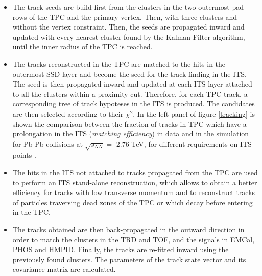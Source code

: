 \documentclass[b5paper,10pt,twoside,oldstyle,classica]{toptesi}
\begin{document}
\begin{itemize}
 \item The track seeds are build first from the clusters in the two outermost pad rows of the TPC and the primary vertex. Then, with three clusters and without the vertex constraint. Then, the seeds are propagated inward and updated with every nearest cluster found by the Kalman Filter algorithm, until the inner radius of the TPC is reached.
 \item The tracks reconstructed in the TPC are matched to the hits in the outermost SSD layer and become the seed for the track finding in the ITS. The seed is then propagated inward and updated at each ITS layer attached to all the clusters within a proximity cut. Therefore, for each TPC track, a corresponding tree of track hypoteses in the ITS is produced. The candidates are then selected according to their $\chi^2$. In the left panel of figure \ref{tracking} is shown the comparison between the fraction of tracks in TPC which have a prolongation in the ITS (\textit{matching efficiency}) in data and in the simulation for Pb-Pb collisions at $\sqrt{s_{NN}} =$ 2.76 TeV, for different requirements on ITS points \cite{Abelev:2014ffa}. 
 \item The hits in the ITS not attached to tracks propagated from the TPC are used to perform an ITS stand-alone reconstruction, which allows to obtain a better efficiency for tracks with low transverse momentum and to reconstruct tracks of particles traversing dead zones of the TPC or which decay before entering in the TPC. 
 \item The tracks obtained are then back-propagated in the outward direction in order to match the clusters in the TRD and TOF, and the signals in EMCal, PHOS and HMPID. Finally, the tracks are re-fitted inward using the previously found clusters. The parameters of the track state vector and its covariance matrix are calculated. 
\end{itemize}
\end{document}
